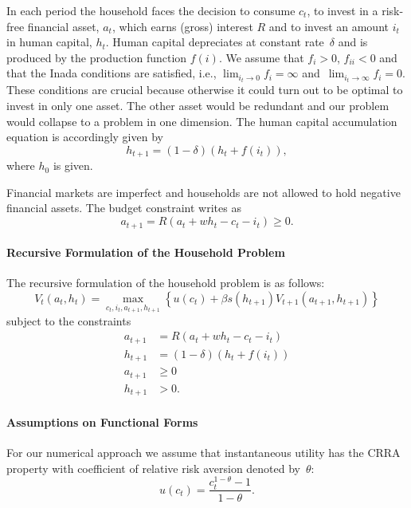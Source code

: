 \documentclass[a4paper,12pt]{article}
\begin{document}
In each period the household faces the decision to consume $c_{t}$, to invest in a risk-free financial asset, $a_{t}$, which earns (gross) interest $R$ and to invest an amount $i_{t}$ in human capital, $h_{t}$. Human capital depreciates at constant rate~$\delta$ and is produced by the production function $f\left( i\right)$. We assume that $f_{i}>0$, $f_{ii}<0$ and that the Inada conditions are satisfied, i.e., $\lim_{i_{t}\rightarrow0}f_{i}=\infty$ and~$\lim_{i_{t}\rightarrow\infty}f_{i}=0$. These conditions are crucial because otherwise it could turn out to be optimal to invest in only one asset. The other asset would be redundant and our problem would collapse to a problem in one dimension. The human capital accumulation equation is
accordingly given by
\begin{equation}
	h_{t+1} = (1 - \delta) \left(h_{t} + f\left(i_{t}\right)\right),
	\label{eq:hkaccum}
\end{equation}
where $h_{0}$ is given.

Financial markets are imperfect and households are not allowed to hold negative financial assets. The budget constraint writes as
\[
	a_{t+1} = R(a_{t} + w h_{t} - c_{t} - i_{t}) \geq0.
\]

\paragraph{Recursive Formulation of the Household Problem}

The recursive formulation of the household problem is as follows:
\[
	V_{t}(a_{t},h_{t})=\underset{c_{t},i_{t},a_{t+1},h_{t+1}}{\max}\left\{u(c_{t}) + \beta s\left(h_{t+1}\right) V_{t+1}(a_{t+1},h_{t+1})\right\}
\]
subject to the constraints
\begin{align}
	a_{t+1}  &  = R \left(a_{t} + w h_{t} - c_{t} - i_{t}\right)  \nonumber \\
	h_{t+1}  &  =\left(1 - \delta\right) \left(h_{t} + f\left(i_{t}\right)\right)  \nonumber \\
	a_{t+1}  &  \geq0  \nonumber \\
	h_{t+1}  &  >0. \label{eq:hinequ}
\end{align}

\paragraph{Assumptions on Functional Forms}

For our numerical approach we assume that instantaneous utility has the CRRA property with coefficient of relative risk aversion denoted by~$\theta$:
\[
	u\left(c_{t}\right) = \frac{c_{t}^{1 - \theta}-1} {1 - \theta}.
\]
\end{document}
